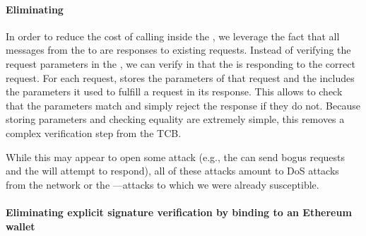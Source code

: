 \iffalse
As described in Section~\ref{sec:architecture}, \tc has two trusted components: the \encname and \tcont.
These components must communicate with each other, but can only do so over insecure channels (through the \medname).
Moreover, these components comprise very different properties.
\tcont resides on the blockchain where users can interact directly with \tc and all computation is verifiable, expensive, and transparent.
The \encname provides a private and less expensive environment, but all interaction (user or otherwise) must go through an untrusted intermediary.

The simplest way to ensure authentic communication between the components is to have both perform verification;
\tcont receives signed messages from the \encname and verifies the signatures,
and the \encname receives raw blocks and verifies that they are well-formed.
Unfortunately, both of these verification mechanisms require a large amount of computation and complex code.
\fi


\paragraph{Eliminating \oauth}

In order to reduce
the cost of calling \oauth inside the \tcboff, we leverage
the fact that all messages from the \tcboff to \tcbon  are responses to existing
requests.  Instead of verifying the request parameters in the \tcboff, we can
verify in \tcbon that the \tcboff is responding to the correct request.  For
each request, \tcbon stores the parameters of that request and the \tcboff
includes the parameters it used to fulfill a request in its response.  This
allows \tcbon to check that the parameters match and simply reject the response
if they do not.  Because storing parameters and checking equality are extremely
simple, this removes a complex verification step from the TCB.

While this may appear to open some attack (e.g., the \medname can send bogus
requests and the \tcboff will attempt to respond), all of these attacks amount
to DoS attacks from the network or the \medname---attacks to which we were
already susceptible.


\paragraph{Eliminating explicit signature verification
by binding \tcboff to an Ethereum wallet \tcadd}

